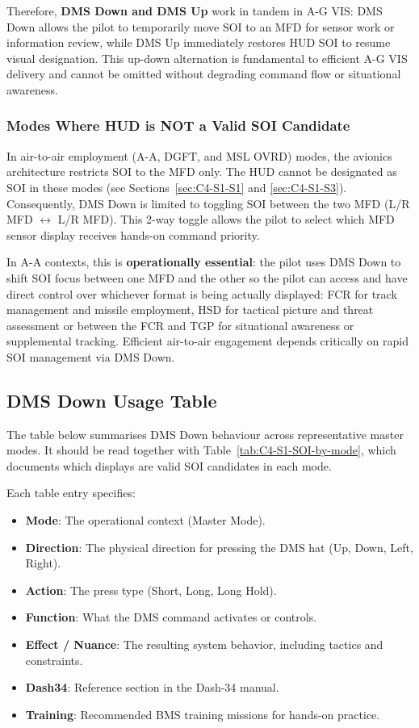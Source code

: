 \documentclass[11pt, a4paper, twoside]{report}
\begin{document}
Therefore, \textbf{DMS Down and DMS Up} work in tandem in A-G VIS: DMS Down allows the pilot to temporarily move SOI to an MFD for sensor work or information review, while DMS Up immediately restores HUD SOI to resume visual designation. This up-down alternation is fundamental to efficient A-G VIS delivery and cannot be omitted without degrading command flow or situational awareness.

\subsubsection{Modes Where HUD is NOT a Valid SOI Candidate}
\label{sec:C4-S3-S1-S2}

In air-to-air employment (A-A, DGFT, and MSL OVRD) modes, the avionics architecture restricts SOI to the MFD only. The HUD cannot be designated as SOI 
in these modes (see Sections~\ref{sec:C4-S1-S1} and \ref{sec:C4-S1-S3}). Consequently, DMS Down is limited to toggling SOI between the two MFD (L/R MFD $\leftrightarrow$ L/R MFD). This 2-way toggle allows the pilot to select which MFD sensor display receives hands-on command priority.

In A-A contexts, this is \textbf{operationally essential}: the pilot uses DMS Down to shift SOI focus between one MFD and the other so the pilot can access and have direct control over whichever format is being actually displayed: FCR for track management and missile employment, HSD for tactical picture and threat assessment or between the FCR and TGP for situational awareness or supplemental tracking. Efficient air-to-air engagement depends critically on rapid SOI management via DMS Down.

\subsection{DMS Down Usage Table}
\label{sec:C4-S3-S2}

The table below summarises DMS Down behaviour across representative master modes. It should be read together with Table~\ref{tab:C4-S1-SOI-by-mode}, which documents which displays are valid SOI candidates in each mode.

Each table entry specifies:

\begin{itemize}
	\item \textbf{Mode}: The operational context (Master Mode).
	\item \textbf{Direction}: The physical direction for pressing the DMS hat (Up, Down, Left, Right).
	\item \textbf{Action}: The press type (Short, Long, Long Hold).
	\item \textbf{Function}: What the DMS command activates or controls.
	\item \textbf{Effect / Nuance}: The resulting system behavior, including tactics and constraints.
	\item \textbf{Dash34}: Reference section in the Dash-34 manual.
	\item \textbf{Training}: Recommended BMS training missions for hands-on practice.
\end{itemize}
\end{document}
